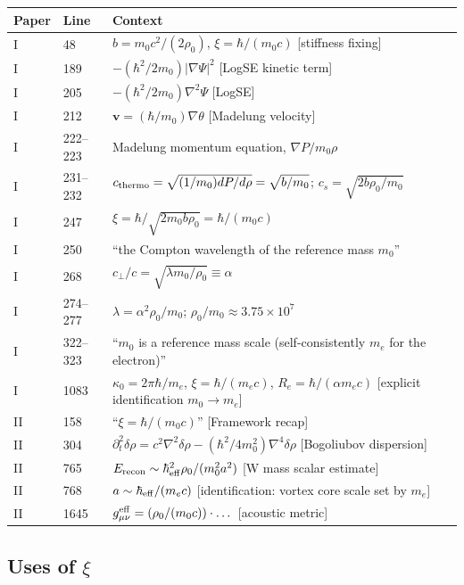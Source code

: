 \documentclass[11pt,a4paper]{article}
\begin{document}
\begin{longtable}{@{}llp{9cm}@{}}
\toprule
Paper & Line & Context \\
\midrule
\endhead
I  & 48   & $b = m_0 c^2/(2\rho_0)$, $\xi = \hbar/(m_0 c)$ [stiffness fixing] \\
I  & 189  & $-(\hbar^2/2m_0)|\nabla\Psi|^2$ [LogSE kinetic term] \\
I  & 205  & $-(\hbar^2/2m_0)\nabla^2\Psi$ [LogSE] \\
I  & 212  & $\mathbf{v}=(\hbar/m_0)\nabla\theta$ [Madelung velocity] \\
I  & 222--223 & Madelung momentum equation, $\nabla P/m_0 \rho$ \\
I  & 231--232 & $c_{\rm thermo}=\sqrt{(1/m_0)dP/d\rho}=\sqrt{b/m_0}$;
                $c_s=\sqrt{2b\rho_0/m_0}$ \\
I  & 247  & $\xi = \hbar/\sqrt{2 m_0 b\rho_0} = \hbar/(m_0 c)$ \\
I  & 250  & ``the Compton wavelength of the reference mass $m_0$'' \\
I  & 268  & $c_\perp/c = \sqrt{\lambda m_0/\rho_0} \equiv \alpha$ \\
I  & 274--277 & $\lambda = \alpha^2 \rho_0/m_0$;
                $\rho_0/m_0 \approx 3.75\times 10^7$ \\
I  & 322--323 & ``$m_0$ is a reference mass scale (self-consistently $m_e$
                for the electron)'' \\
I  & 1083  & $\kappa_0 = 2\pi\hbar/m_e$, $\xi = \hbar/(m_e c)$,
                $R_e = \hbar/(\alpha m_e c)$ [explicit identification
                $m_0 \to m_e$] \\
\midrule
II & 158  & ``$\xi = \hbar/(m_0 c)$'' [Framework recap] \\
II & 304  & $\partial_t^2\delta\rho = c^2\nabla^2\delta\rho - (\hbar^2/4m_0^2)\nabla^4\delta\rho$
            [Bogoliubov dispersion] \\
II & 765  & $E_{\rm recon} \sim \hbar_{\rm eff}^2 \rho_0/(m_0^2 a^2)$
            [W mass scalar estimate] \\
II & 768  & $a \sim \hbar_{\rm eff}/(m_e c)$ [identification: vortex core
            scale set by $m_e$] \\
II & 1645 & $g^{\rm eff}_{\mu\nu} = (\rho_0/(m_0 c)) \cdot \dots$
            [acoustic metric] \\
\bottomrule
\end{longtable}

\subsection{Uses of $\xi$}
\end{document}
